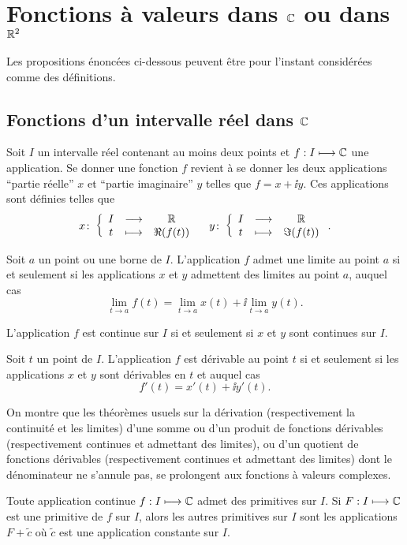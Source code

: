 \chapter{Fonctions à valeurs dans \(\mathbb{C}\) ou dans \(\mathbb{R}^2\)}
Les propositions énoncées ci-dessous peuvent être pour l'instant considérées comme des définitions.
\section{Fonctions d'un intervalle réel dans \(\mathbb{C}\)}
Soit \(I\) un intervalle réel contenant au moins deux points et \(f : I \longmapsto \mathbb{C}\) une application. Se donner une fonction \(f\) revient à se donner les deux applications ``partie réelle'' \(x\)  et ``partie imaginaire'' \(y\) telles que \(f=x+\ii y\). Ces applications sont définies telles que
\begin{equation}
  x\colon \left\{\begin{array}{ccc} I & \longrightarrow &\mathbb{R}\\ t & \longmapsto & \Re(f(t)) \end{array} \right. \quad   y\colon \left\{\begin{array}{ccc} I & \longrightarrow &\mathbb{R}\\ t & \longmapsto & \Im(f(t)) \end{array} \right..
\end{equation}
\begin{prop}
  Soit \(a\) un point ou une borne de \(I\). L'application \(f\) admet une limite au point \(a\) si et seulement si les applications \(x\) et \(y\) admettent des limites au point \(a\), auquel cas
  \begin{equation}
    \lim\limits_{t \to a} f(t) = \lim\limits_{t \to a} x(t) +\ii \lim\limits_{t \to a} y(t).
  \end{equation}
\end{prop}
\begin{prop}
  L'application \(f\) est continue sur \(I\) si et seulement si \(x\) et \(y\) sont continues sur \(I\).
\end{prop}
\begin{prop}
    \label{prop:derivefcomplexe}
  Soit \(t\) un point de \(I\). L'application \(f\) est dérivable au point \(t\) si et seulement si les applications \(x\) et \(y\) sont dérivables en \(t\) et auquel cas
  \begin{equation}
    f'(t) = x'(t) + \ii y'(t).
  \end{equation}
\end{prop}
%
On montre que les théorèmes usuels sur la dérivation (respectivement la continuité et les limites) d'une somme ou d'un produit de fonctions dérivables (respectivement continues et admettant des limites), ou d'un quotient de fonctions dérivables (respectivement continues et admettant des limites) dont le dénominateur ne s'annule pas, se prolongent aux fonctions à valeurs complexes.
%
\begin{theo}
Toute application continue \(f : I \longmapsto \mathbb{C}\) admet des primitives sur \(I\). Si \(F : I \longmapsto \mathbb{C}\) est une primitive de \(f\) sur \(I\), alors les autres primitives sur \(I\) sont les applications \(F+\tilde{c}\) où \(\tilde{c}\) est une application constante sur \(I\).
\end{theo}

